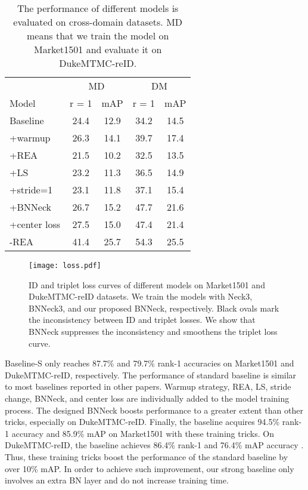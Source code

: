 \documentclass[journal]{IEEEtran}
\begin{document}
\renewcommand{\multirowsetup}{\centering}
\begin{table}[htb]\small
  \begin{center}
  \begin{tabular}{ l|cc|cc}
\hline
    			& \multicolumn{2}{c|}{MD} & \multicolumn{2}{c}{DM}	 \\
  Model			& r = 1 	& mAP	&r = 1 	& mAP 	 \\
 	\hline
	\hline
Baseline		&24.4	&12.9	&34.2	&14.5			\\
+warmup         &26.3	&14.1	&39.7	&17.4           \\
+REA            &21.5	&10.2	&32.5	&13.5			\\
+LS	            &23.2	&11.3	&36.5	&14.9			\\
+stride=1	    &23.1	&11.8	&37.1	&15.4			\\
+BNNeck	        &26.7	&15.2	&47.7	&21.6			\\
+center loss	&27.5	&15.0	&47.4	&21.4			\\
-REA            &41.4	&25.7	&54.3	&25.5			\\
\hline

  \end{tabular}
  \end{center}
  \caption{\label{cd}The performance of different models is evaluated on cross-domain datasets. MD means that we train the model on Market1501 and evaluate it on DukeMTMC-reID.}
\end{table}

\begin{figure*}[tb]
\centering
\texttt{[image: loss.pdf]}
\vspace{-9mm}
\caption{ID and triplet loss curves of different models on Market1501 and DukeMTMC-reID datasets. We train the models with Neck3, BNNeck3, and our proposed BNNeck, respectively. Black ovals mark the inconsistency between ID and triplet losses. We show that BNNeck suppresses the inconsistency and smoothens the triplet loss curve.}
\label{fig:loss}
\vspace{-5mm}
\end{figure*}


Baseline-S only reaches 87.7\% and 79.7\% rank-1 accuracies on Market1501 and DukeMTMC-reID, respectively.
The performance of standard baseline is similar to most baselines reported in other papers.
Warmup strategy, REA, LS, stride change, BNNeck, and center loss are individually added to the model training process.
The designed BNNeck boosts performance to a greater extent than other tricks, especially on DukeMTMC-reID.
Finally, the baseline acquires 94.5\% rank-1 accuracy and 85.9\% mAP on Market1501 with these training tricks.
On DukeMTMC-reID, the baseline achieves 86.4\% rank-1 and 76.4\% mAP accuracy .
Thus, these training tricks boost the performance of the standard baseline by over 10\% mAP.
In order to achieve such improvement, our strong baseline only involves an extra BN layer and do not increase training time.
\end{document}
